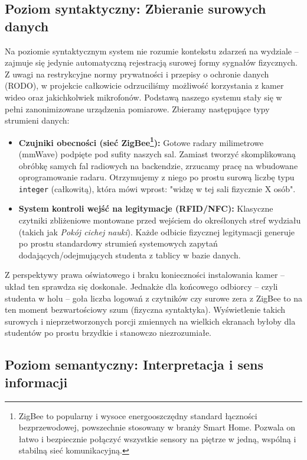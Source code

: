 \documentclass[14pt,a4paper]{extarticle}
\begin{document}
\subsection{Poziom syntaktyczny: Zbieranie surowych danych}

Na poziomie syntaktycznym system nie rozumie kontekstu zdarzeń na wydziale -- zajmuje się jedynie automatyczną rejestracją surowej formy sygnałów fizycznych. Z uwagi na restrykcyjne normy prywatności i przepisy o ochronie danych (RODO), w projekcie całkowicie odrzuciliśmy możliwość korzystania z kamer wideo oraz jakichkolwiek mikrofonów. Podstawą naszego systemu stały się w pełni zanonimizowane urządzenia pomiarowe. Zbieramy następujące typy strumieni danych:
\begin{itemize}
    \item \textbf{Czujniki obecności (sieć ZigBee\footnote{ZigBee to popularny i wysoce energooszczędny standard łączności bezprzewodowej, powszechnie stosowany w branży Smart Home. Pozwala on łatwo i bezpiecznie połączyć wszystkie sensory na piętrze w jedną, wspólną i stabilną sieć komunikacyjną.}):} Gotowe radary milimetrowe (mmWave) podpięte pod sufity naszych sal. Zamiast tworzyć skomplikowaną obróbkę samych fal radiowych na backendzie, zrzucamy pracę na wbudowane oprogramowanie radaru. Otrzymujemy z niego po prostu surową liczbę typu \texttt{integer} (całkowitą), która mówi wprost: "widzę w tej sali fizycznie X osób".
    \item \textbf{System kontroli wejść na legitymacje (RFID/NFC):} Klasyczne czytniki zbliżeniowe montowane przed wejściem do określonych stref wydziału (takich jak \textit{Pokój cichej nauki}). Każde odbicie fizycznej legitymacji generuje po prostu standardowy strumień systemowych zapytań dodających/odejmujących studenta z tablicy w bazie danych.
\end{itemize}
Z perspektywy prawa oświatowego i braku konieczności instalowania kamer – układ ten sprawdza się doskonale. Jednakże dla końcowego odbiorcy – czyli studenta w holu – goła liczba logowań z czytników czy surowe zera z ZigBee to na ten moment bezwartościowy szum (fizyczna syntaktyka). Wyświetlenie takich surowych i nieprzetworzonych porcji zmiennych na wielkich ekranach byłoby dla studentów po prostu brzydkie i stanowczo niezrozumiałe.

\subsection{Poziom semantyczny: Interpretacja i sens informacji}
\end{document}
